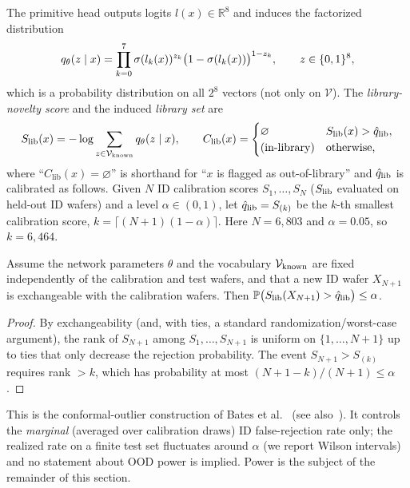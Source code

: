 The primitive head outputs logits $l(x)\in\mathbb{R}^8$ and induces the factorized distribution
\begin{equation}
  q_\theta(z\mid x)=\prod_{k=0}^{7}\sigma(l_k(x))^{z_k}\bigl(1-\sigma(l_k(x))\bigr)^{1-z_k},
  \qquad z\in\{0,1\}^8 ,
  \label{eq:q}
\end{equation}
which is a probability distribution on all $2^8$ vectors (not only on $\mathcal{V}$). The
\emph{library-novelty score} and the induced \emph{library set} are
\begin{equation}
  S_{\mathrm{lib}}(x)=-\log\sum_{z\in\mathcal{V}_{\mathrm{known}}}q_\theta(z\mid x),
  \qquad
  C_{\mathrm{lib}}(x)=\begin{cases}\varnothing & S_{\mathrm{lib}}(x)>\hat q_{\mathrm{lib}},\\ \text{(in-library)} & \text{otherwise,}\end{cases}
  \label{eq:slib}
\end{equation}
where ``$C_{\mathrm{lib}}(x)=\varnothing$'' is shorthand for ``$x$ is flagged as out-of-library''
and $\hat q_{\mathrm{lib}}$ is calibrated as follows. Given $N$ ID calibration scores
$S_1,\dots,S_N$ ($S_{\mathrm{lib}}$ evaluated on held-out ID wafers) and a level $\alpha\in(0,1)$, let
$\hat q_{\mathrm{lib}}=S_{(k)}$ be the $k$-th smallest calibration score, $k=\lceil (N+1)(1-\alpha)\rceil$.
Here $N=6{,}803$ and $\alpha=0.05$, so $k=6{,}464$.

\begin{lemma}\label{lem:conformal}
Assume the network parameters $\theta$ and the vocabulary $\mathcal{V}_{\mathrm{known}}$ are fixed independently of the
calibration and test wafers, and that a new ID wafer $X_{N+1}$ is exchangeable with the
calibration wafers. Then $\mathbb{P}\bigl(S_{\mathrm{lib}}(X_{N+1})>\hat q_{\mathrm{lib}}\bigr)\le\alpha$.
\end{lemma}
\begin{proof}
By exchangeability (and, with ties, a standard randomization/worst-case argument), the rank of
$S_{N+1}$ among $S_1,\dots,S_{N+1}$ is uniform on $\{1,\dots,N+1\}$ up to ties that only
decrease the rejection probability. The event $S_{N+1}>S_{(k)}$ requires rank $>k$, which has
probability at most $(N+1-k)/(N+1)\le\alpha$.
\end{proof}
This is the conformal-outlier construction of Bates et al.~\cite{bates2023conformal}
(see also~\cite{vovk2005algorithmic,angelopoulos2023gentle}). It controls the \emph{marginal}
(averaged over calibration draws) ID false-rejection rate only; the realized rate on a finite
test set fluctuates around $\alpha$ (we report Wilson intervals) and no statement about OOD power
is implied. Power is the subject of the remainder of this section.

